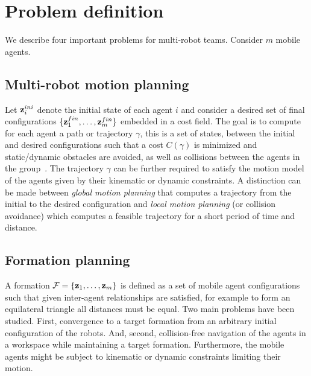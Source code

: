 
\section{Problem definition}\label{sec:2}

We describe four important problems for multi-robot teams. Consider $m$ mobile agents. 

\subsection{Multi-robot motion planning}
Let $\textbf{z}^{ini}_i$ denote the initial state of each agent $i$ and consider a desired set of final configurations $\{\textbf{z}^{fin}_1,  \dots, \textbf{z}^{fin}_m \}$ embedded in a cost field.
The goal is to compute for each agent a path or trajectory $\gamma$, this is a set of states, between the initial and desired configurations such that a cost $C(\gamma)$ is minimized and static/dynamic obstacles are avoided, as well as collisions between the agents in the group~\citet{lavalle06}. The trajectory $\gamma$ can be further required to satisfy the motion model of the agents given by their kinematic or dynamic constraints.
A distinction can be made between \emph{global motion planning} that computes a trajectory from the initial to the desired configuration and \emph{local motion planning} (or collision avoidance) which computes a feasible trajectory for a short period of time and distance.

\subsection{Formation planning}
A formation $\mathcal{F} = \{ \textbf{z}_1,  \dots, \textbf{z}_m \}$ is defined as a set of mobile agent configurations such that given inter-agent relationships are satisfied, for example to form an equilateral triangle all distances must be equal.
Two main problems have been studied. First, convergence to a target formation from an arbitrary initial configuration of the robots. And, second, collision-free navigation of the agents in a workspace while maintaining a target formation. Furthermore, the mobile agents might be subject to kinematic or dynamic constraints limiting their motion.

